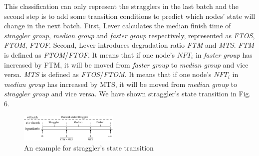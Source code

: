   This classification can only represent the stragglers in the last batch and the second step is to add some transition conditions to predict which nodes' state will change in the next batch. First, Lever calculates the median finish time of \emph{straggler group}, \emph{median group} and \emph{faster group} respectively, represented as \emph{FTOS}, \emph{FTOM}, \emph{FTOF}. Second, Lever introduces degradation ratio \emph{FTM} and \emph{MTS}. \emph{FTM} is defined as \emph{FTOM}/\emph{FTOF}. It means that if one node's $NFT_i$ in \emph{faster group} has increased by FTM, it will be moved from \emph{faster group} to \emph{median group} and vice versa. \emph{MTS} is defined as \emph{FTOS}/\emph{FTOM}. It means that if one node's $NFT_i$ in \emph{median group} has increased by MTS, it will be moved from \emph{median group} to \emph{straggler group} and vice versa. We have shown straggler's state transition in Fig. 6.
  \begin{figure}[htbp]
    \centering
    \includegraphics[width=0.42\textwidth]{FigureI2}
    \caption{An example for straggler's state transition}
    \label{Fig. 6:}
  \end{figure}

